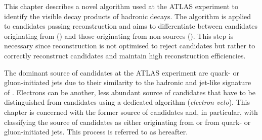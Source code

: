 This chapter describes a novel algorithm used at the ATLAS experiment to
identify the visible decay products of hadronic \tauleptonC decays. The algorithm
is applied to \tauhadvis candidates passing \tauhadvis reconstruction and aims
to differentiate between candidates originating from \tauhad (\truetauhadvis)
and those originating from non-\tauhad sources (\faketauhadvis). This step is
necessary since \tauhadvis reconstruction is not optimised to reject
\faketauhadvis candidates but rather to correctly reconstruct \truetauhadvis
candidates and maintain high \tauhadvis reconstruction efficiencies.

The dominant source of \faketauhadvis candidates at the ATLAS experiment are
quark- or gluon-initiated jets due to their similarity to the hadronic and
jet-like signature of \tauhadvis. Electrons can be another, less abundant source
of \faketauhadvis candidates that have to be distinguished from \truetauhadvis
candidates using a dedicated algorithm (\emph{electron veto}). This chapter is
concerned with the former source of \faketauhadvis candidates and, in
particular, with classifying the source of \tauhadvis candidates as either
originating from \tauhad or from quark- or gluon-initiated jets. This process is
referred to as \tauid hereafter.

